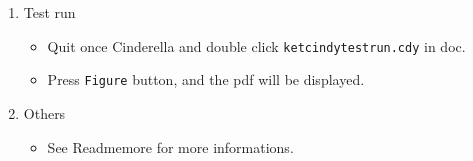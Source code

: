 \documentclass{article}
\begin{document}
\begin{enumerate}[\bf\large 1.]
\vspace{72mm}

\item Test run
\begin{itemize}
\item Quit once Cinderella and double click \verb|ketcindytestrun.cdy| in doc.
\item Press \verb|Figure| button, and the pdf will be displayed.
\end{itemize}

\item Others
\begin{itemize}
\item See Readmemore for more informations.
\end{itemize}

  \end{enumerate}
\end{document}
